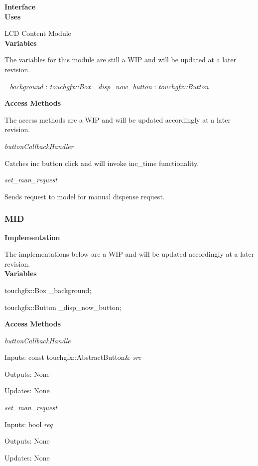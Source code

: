 \documentclass[12pt,titlepage]{article}
\begin{document}
\noindent \textbf{Interface} \\

\noindent \textbf{Uses}

\noindent LCD Content Module \\

\noindent \textbf{Variables}

\noindent The variables for this module are still a WIP and will be updated at a later revision. \newline

\noindent \textit{\_background} : \textit{touchgfx::Box} \newline
\noindent \textit{\_disp\_now\_button} : \textit{touchgfx::Button} \newline

\noindent \textbf{Access Methods}

\noindent The access methods are a WIP and will be updated accordingly at a later revision. \par

\textit{buttonCallbackHandler} \par
Catches inc button click and will invoke inc\_time functionality.

\textit{set\_man\_request} \par
Sends request to model for manual dispense request.

\subsubsection*{MID}

\noindent \textbf{Implementation} 

\noindent The implementations below are a WIP and will be updated accordingly at a later revision.\\

\noindent \textbf{Variables}

touchgfx::Box \_background; \par
touchgfx::Button \_disp\_now\_button; \par

\noindent \textbf{Access Methods} 

\textit{buttonCallbackHandle} \par
Inputs: const touchgfx::AbstractButton& \textit{src} \par
Outputs: None \par
Updates: None \newline

\textit{set\_man\_request} \par
Inputs: bool \textit{req} \par
Outputs: None \par
Updates: None \newline
\end{document}
